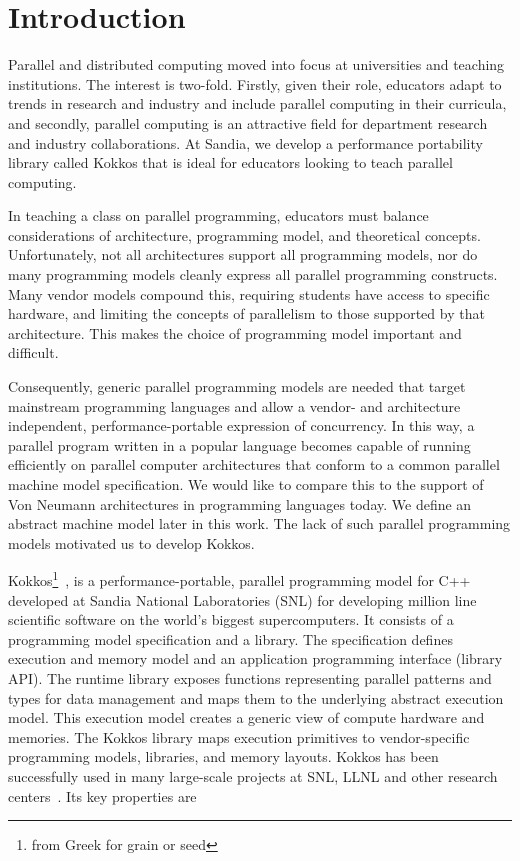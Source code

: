 
\section{Introduction}\label{chap:introduction}

Parallel and distributed computing moved into focus at universities and teaching institutions. The interest is two-fold. Firstly, given their role, educators adapt to trends in research and industry and include parallel computing in their curricula, and secondly, parallel computing is an attractive field for department research and industry collaborations. At Sandia, we develop a performance portability library called Kokkos that is ideal for educators looking to teach parallel computing.

In teaching a class on parallel programming, educators must balance considerations of architecture, programming model, and theoretical concepts. Unfortunately, not all architectures support all programming models, nor do many programming models cleanly express all parallel programming constructs. Many vendor models compound this, requiring students have access to specific hardware, and limiting the concepts of parallelism to those supported by that architecture. This makes the choice of programming model important and difficult.

Consequently, generic parallel programming models are needed that target mainstream programming languages and allow a vendor- and architecture independent, performance-portable expression of concurrency. In this way, a parallel program written in a popular language becomes capable of running efficiently on parallel computer architectures that conform to a common parallel machine model specification. We would like to compare this to the support of Von Neumann architectures in programming languages today. We define an abstract machine model later in this work. The lack of such parallel programming models motivated us to develop Kokkos.

Kokkos\footnote{from Greek for grain or seed}~\cite{KOKKOS_PAPER_HERE}, is a performance-portable, parallel programming model for C++ developed at Sandia National Laboratories (SNL) for developing million line scientific software on the world's biggest supercomputers. It consists of a programming model specification and a library. The specification defines execution and memory model and an application programming interface (library API). The runtime library exposes functions representing parallel patterns and types for data management and maps them to the underlying abstract execution model. This execution model creates a generic view of compute hardware and memories. The Kokkos library maps execution primitives to vendor-specific programming models, libraries, and memory layouts. Kokkos has been successfully used in many large-scale projects at SNL, LLNL and other research centers~\cite{CITEKOKKOSUSECASES}. Its key properties are

